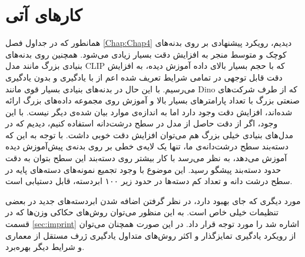 \section{کار‌های آتی}

همانطور که در جداول فصل
\ref{Chap:Chap4}
دیدیم، رویکرد پیشنهادی بر روی بدنه‌های کوچک و متوسط منجر به افزایش دقت بسیار زیادی می‌شود. همچنین روی بدنه‌های بنیادی بزرگ مانند مدل CLIP که با حجم بسیار بالای داده آموزش دیده، به افزایش دقت قابل توجهی در تمامی شرایط تعریف شده اعم از با یادگیری و بدون یادگیری می‌رسیم. با این حال در بدنه‌های بنیادی بسیار قوی مانند Dino که از طرف شرکت‌های صنعتی بزرگ با تعداد پارامترهای بسیار بالا و آموزش روی مجموعه داده‌های بزرگ ارائه شده‌اند، افزایش دقت وجود دارد اما به اندازه‌ی موارد بیان شده‌ی دیگر نیست. با این وجود، اگر از دقت حاصل از مدل 
در سطح درشت‌دانه استفاده کنیم، دیدیم که در مدل‌های بنیادی خیلی بزرگ هم می‌توان افزایش دقت خوبی داشت. با توجه به این که دسته‌بند سطح درشت‌دانه‌ی ما، تنها یک لایه‌ی خطی بر روی بدنه‌ی پیش‌آموزش دیده آموزش می‌دهد، به نظر می‌رسد با کار بیشتر روی دسته‌بند این سطح بتوان به دقت حدود دسته‌بند پیشگو رسید. این موضوع با وجود تجمیع نمونه‌های دسته‌های پایه در سطح درشت دانه و تعداد کم دسته‌ها در حدود زیر ۱۰۰ ابردسته، قابل دستیابی است.

مورد دیگری که جای بهبود دارد، در نظر گرفتن اضافه شدن ابردسته‌های جدید در بعضی تنظیمات خیلی خاص است. به این منظور می‌توان روش‌های حکاکی وزن‌ها که در قسمت
\ref{sec:imprint}
اشاره شد را مورد توجه قرار داد. در این صورت همچنان می‌توان از رویکرد یادگیری تمایزگذار و اکثر روش‌های متداول یادگیری ژرف مستقل از معماری و شرایط دیگر بهره‌برد.
